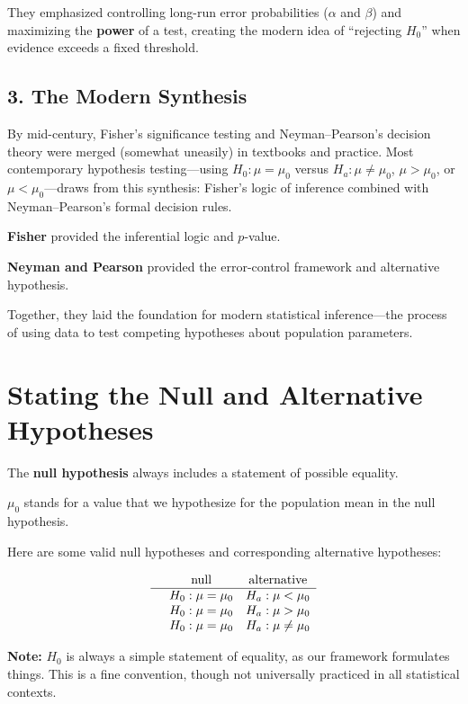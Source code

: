 \documentclass[
  letterpaper,
  DIV=11,
  numbers=noendperiod]{scrreprt}
\begin{document}
They emphasized controlling long-run error probabilities (\(\alpha\) and
\(\beta\)) and maximizing the \textbf{power} of a test, creating the
modern idea of ``rejecting \(H_0\)'' when evidence exceeds a fixed
threshold.

\subsection{3. The Modern Synthesis}\label{the-modern-synthesis}

By mid-century, Fisher's significance testing and Neyman--Pearson's
decision theory were merged (somewhat uneasily) in textbooks and
practice. Most contemporary hypothesis testing---using
\(H_0: \mu = \mu_0\) versus \(H_a: \mu \neq \mu_0\), \(\mu > \mu_0\), or
\(\mu < \mu_0\)---draws from this synthesis: Fisher's logic of inference
combined with Neyman--Pearson's formal decision rules.

\textbf{Fisher} provided the inferential logic and \(p\)-value.

\textbf{Neyman and Pearson} provided the error-control framework and
alternative hypothesis.

Together, they laid the foundation for modern statistical
inference---the process of using data to test competing hypotheses about
population parameters.

\section{Stating the Null and Alternative
Hypotheses}\label{stating-the-null-and-alternative-hypotheses}

The \textbf{null hypothesis} always includes a statement of possible
equality.

\(\mu_0\) stands for a value that we hypothesize for the population mean
in the null hypothesis.

Here are some valid null hypotheses and corresponding alternative
hypotheses:

\[
\begin{array}{ccc}
& \text{null} & \text{alternative} \\
\hline
& H_0: \mu = \mu_0 & H_a: \mu < \mu_0 \\
& H_0: \mu = \mu_0 & H_a: \mu > \mu_0 \\
& H_0: \mu = \mu_0 & H_a: \mu \neq \mu_0
\end{array}
\]

\textbf{Note:} \(H_0\) is always a simple statement of equality, as our
framework formulates things. This is a fine convention, though not
universally practiced in all statistical contexts.
\end{document}
